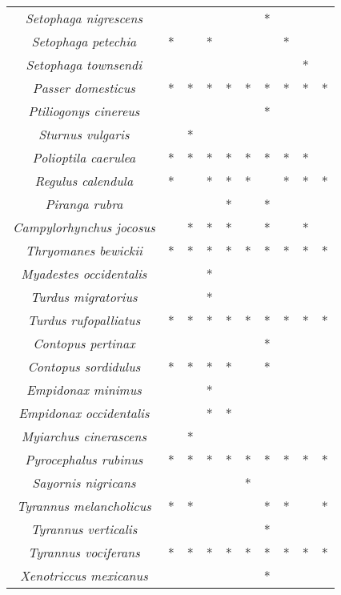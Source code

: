 \documentclass[letterpaper,12pt]{article}
\begin{document}
{\begin{longtable}[c] {|c|c|c|c|c|c|c|c|c|c|}
\textit{Setophaga nigrescens} &  &  &  & & & * & & & \\
\textit{Setophaga petechia} & * &  & * & & & &* & & \\
\textit{Setophaga townsendi} &  &  &  & & & & & * & \\
\textit{Passer domesticus} & * & * & * & * & * & * & * & * & * \\
\textit{Ptiliogonys cinereus} &  &  &  & & & * & & & \\
\textit{Sturnus vulgaris} &  & * &  & & & & & & \\
\textit{Polioptila caerulea} & * & * & * & * & * & * & * & * &  \\
\textit{Regulus calendula} & * &  & * & * & * & & * & * & * \\
\textit{Piranga rubra} &  &  &  & * & & * & & & \\
\textit{Campylorhynchus jocosus} &  & * & * & * & &*& & * & \\
\textit{Thryomanes  bewickii} & * & * & * & * & * & * & * & * & *\\
\textit{Myadestes occidentalis} &  &  & * & & & & & & \\
\textit{Turdus migratorius} &  &  & * & & & & & & \\
\textit{Turdus rufopalliatus} & * & * & * & * & * & * & * & * & * \\
\textit{Contopus pertinax} &  &  &  & & & * & & &  \\
\textit{Contopus sordidulus} & * & * & * & * & &* & & &\\
\textit{Empidonax minimus} &  &  & * & & & & & & \\
\textit{Empidonax occidentalis} &  &  & * & * & & & & &\\
\textit{Myiarchus cinerascens} &  & * &  & & & & & & \\
\textit{Pyrocephalus rubinus} & * & * & * & * & * & * & * & * & *  \\
\textit{Sayornis nigricans} &  &  &  & & * & & & & \\
\textit{Tyrannus melancholicus} & * & * &  & & &* & * & &* \\
\textit{Tyrannus verticalis} &  &  &  & & &* & & & \\
\textit{Tyrannus vociferans} & * & * & * & * & * & * & * & * &*   \\
\textit{Xenotriccus mexicanus} &  &  &  & & & * & & & \\ \bottomrule
\end{longtable}
}
\newpage
\end{document}
